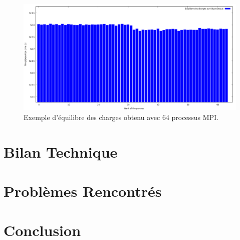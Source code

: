 	\begin{frame}
	\begin{figure}[!ht]	
		\begin{center}\includegraphics[scale=0.35]{equilibre64.png}\end{center}
		\caption{Exemple d'équilibre des charges obtenu avec 64 processus MPI.}
		\label{fg:fig4}
	\end{figure}	
	\end{frame}
	
	\section{Bilan Technique}
	\begin{frame}
	
	\end{frame}
	
	\section{Problèmes Rencontrés}
	\begin{frame}
	
	\end{frame}
	
	\section{Conclusion}
	\begin{frame}
	
	\end{frame}


